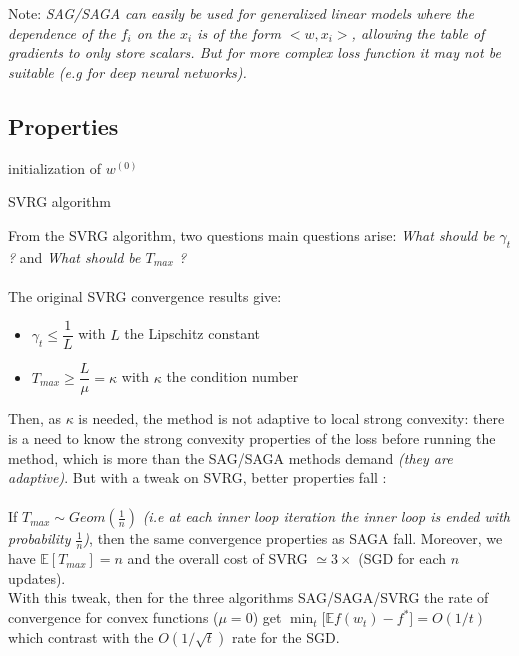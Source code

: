 \documentclass[12pt]{report}
\begin{document}
\begin{paragraph}
{Note: } \textit{SAG/SAGA can easily be used for generalized linear models where the dependence of the $f_i$ on the $x_i$ is of the form $<w, x_i>$, allowing the table of gradients to only store scalars. But for more complex loss function it may not be suitable (e.g for deep neural networks).}
\end{paragraph}

\subsection{Properties}

\begin{algorithm}[H]
\SetAlgoLined
{}
 initialization of $w^{(0)}$\;
 \caption{SVRG algorithm}
\end{algorithm}

From the SVRG algorithm, two questions main questions arise:\textit{ What should be $\gamma_t$ ?} and \textit{ What should be $T_{max}$ ?}
\\
\\
The original SVRG convergence results give:
\begin{itemize}
    \item $\gamma_t \leq \dfrac{1}{L}$ with $L$ the Lipschitz constant
    \item $T_{max} \geq \dfrac{L}{\mu} = \kappa$ with $\kappa$ the condition number
\end{itemize}
Then, as $\kappa$ is needed, the method is not adaptive to local strong convexity: there is a need to know the strong convexity properties of the loss before running the method, which is more than the SAG/SAGA methods demand \textit{(they are adaptive)}. But with a tweak on SVRG, better properties fall \cite{Hofmann2015}:
\\
\\
If $T_{max} \sim Geom(\frac{1}{n})$ \textit{(i.e at each inner loop iteration the inner loop is ended with probability $\frac{1}{n}$)}, then the same convergence properties as SAGA fall. Moreover, we have $\mathbb{E}[T_{max}] = n$ and the overall cost of SVRG $\simeq 3 \times$ (SGD for each $n$ updates).
\\
With this tweak, then for the three algorithms SAG/SAGA/SVRG the rate of convergence for convex functions ($\mu = 0$) get $\min_t \big[ \mathbb{E} f(w_t) - f^* \big] = O(1/t)$ which contrast with the $O(1/\sqrt{t})$ rate for the SGD.
\end{document}
